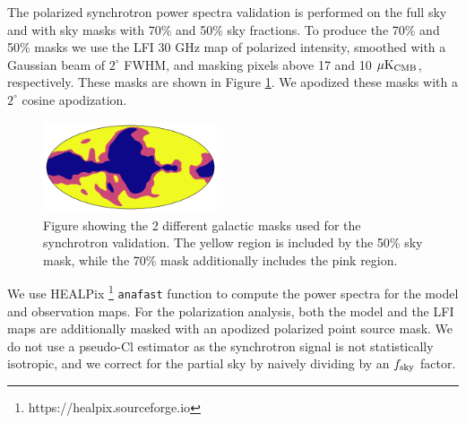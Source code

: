 \documentclass[twocolumn]{aastex631}
\begin{document}
The polarized synchrotron power spectra validation is performed on the full sky and with sky masks with 70\% and 50\% sky fractions. To produce the 70\% and 50\% masks we use the LFI 30 GHz map of polarized intensity, smoothed with a Gaussian beam of $2^\circ$ FWHM, and masking pixels above 17 and 10 $\mu{\rm K}_{\rm CMB}$, respectively. These masks are shown in Figure \ref{fig:sync_masks}. We apodized these masks with a $2^\circ$ cosine apodization.
\begin{figure}
    \centering
    \includegraphics[width=0.46\textwidth]{figures/sync_galactic_mask.png}
    \caption{Figure showing the 2 different galactic masks used for the synchrotron validation. The yellow region is included by the 50\% sky mask, while the 70\% mask additionally includes the pink region.}
    \label{fig:sync_masks}
\end{figure}

We use HEALPix \footnote{https://healpix.sourceforge.io} \texttt{anafast} function \citep{2019JOSS....4.1298Z, 2005ApJ...622..759G}  to compute the power spectra for the model and observation maps. For the polarization analysis, both the model and the LFI maps are additionally masked with an apodized polarized point source mask. We do not use a pseudo-Cl estimator as the synchrotron signal is not statistically isotropic, and we correct for the partial sky by naively dividing by an $f_{\rm sky}$ factor.
\end{document}
